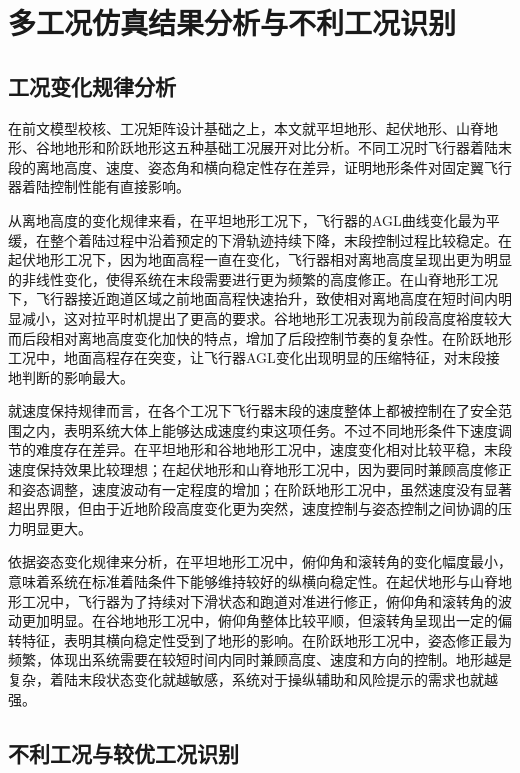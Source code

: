 \chapter{多工况仿真结果分析与不利工况识别}

\section{工况变化规律分析}

在前文模型校核、工况矩阵设计基础之上，本文就平坦地形、起伏地形、山脊地形、谷地地形和阶跃地形这五种基础工况展开对比分析。不同工况时飞行器着陆末段的离地高度、速度、姿态角和横向稳定性存在差异，证明地形条件对固定翼飞行器着陆控制性能有直接影响。

从离地高度的变化规律来看，在平坦地形工况下，飞行器的AGL曲线变化最为平缓，在整个着陆过程中沿着预定的下滑轨迹持续下降，末段控制过程比较稳定。在起伏地形工况下，因为地面高程一直在变化，飞行器相对离地高度呈现出更为明显的非线性变化，使得系统在末段需要进行更为频繁的高度修正。在山脊地形工况下，飞行器接近跑道区域之前地面高程快速抬升，致使相对离地高度在短时间内明显减小，这对拉平时机提出了更高的要求。谷地地形工况表现为前段高度裕度较大而后段相对离地高度变化加快的特点，增加了后段控制节奏的复杂性。在阶跃地形工况中，地面高程存在突变，让飞行器AGL变化出现明显的压缩特征，对末段接地判断的影响最大。

就速度保持规律而言，在各个工况下飞行器末段的速度整体上都被控制在了安全范围之内，表明系统大体上能够达成速度约束这项任务。不过不同地形条件下速度调节的难度存在差异。在平坦地形和谷地地形工况中，速度变化相对比较平稳，末段速度保持效果比较理想；在起伏地形和山脊地形工况中，因为要同时兼顾高度修正和姿态调整，速度波动有一定程度的增加；在阶跃地形工况中，虽然速度没有显著超出界限，但由于近地阶段高度变化更为突然，速度控制与姿态控制之间协调的压力明显更大。

依据姿态变化规律来分析，在平坦地形工况中，俯仰角和滚转角的变化幅度最小，意味着系统在标准着陆条件下能够维持较好的纵横向稳定性。在起伏地形与山脊地形工况中，飞行器为了持续对下滑状态和跑道对准进行修正，俯仰角和滚转角的波动更加明显。在谷地地形工况中，俯仰角整体比较平顺，但滚转角呈现出一定的偏转特征，表明其横向稳定性受到了地形的影响。在阶跃地形工况中，姿态修正最为频繁，体现出系统需要在较短时间内同时兼顾高度、速度和方向的控制。地形越是复杂，着陆末段状态变化就越敏感，系统对于操纵辅助和风险提示的需求也就越强。

\section{不利工况与较优工况识别}

